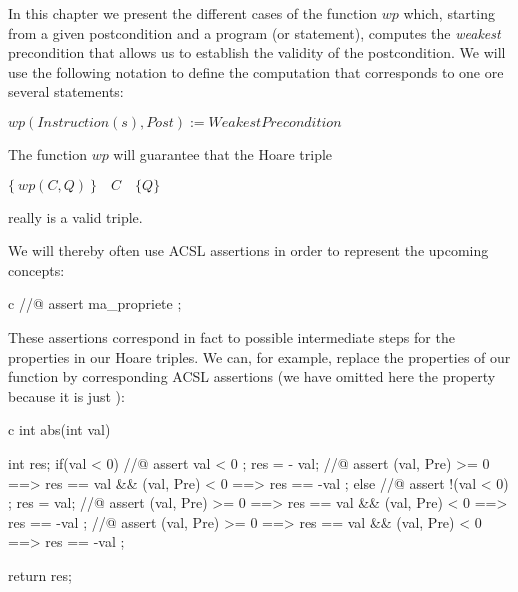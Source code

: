 \documentclass[middle]{zmdocument}
\begin{document}
In this chapter we present the different cases of the function $wp$
which, starting from a given postcondition and a program (or statement),
computes the \emph{weakest} precondition that allows us to establish the
validity of the postcondition. We will use the following notation to
define the computation that corresponds to one ore several statements:



$wp(Instruction(s), Post) := WeakestPrecondition$



The function \(wp\) will guarantee that the Hoare triple




\begin{center}
$\{\ wp(C,Q)\ \}\quad C\quad \{ Q \}$


\end{center}


really is a valid triple.



We will thereby often use ACSL assertions in order to represent the
upcoming concepts:



\begin{CodeBlock}{c}
//@ assert ma_propriete ;
\end{CodeBlock}



These assertions correspond in fact to possible intermediate steps for
the properties in our Hoare triples. We can, for example, replace the
properties of our function  by corresponding ACSL assertions
(we have omitted here the property  because it is just
):



\begin{CodeBlock}{c}
int abs(int val){
  int res;
  if(val < 0){
    //@ assert val < 0 ;
    res = - val;
    //@ assert \at(val, Pre) >= 0 ==> res == val && \at(val, Pre) < 0 ==> res == -val ;
  } else {
    //@ assert !(val < 0) ;
    res = val;
    //@ assert \at(val, Pre) >= 0 ==> res == val && \at(val, Pre) < 0 ==> res == -val ;
  }
  //@ assert \at(val, Pre) >= 0 ==> res == val && \at(val, Pre) < 0 ==> res == -val ;

  return res;
}
\end{CodeBlock}





\end{document}
